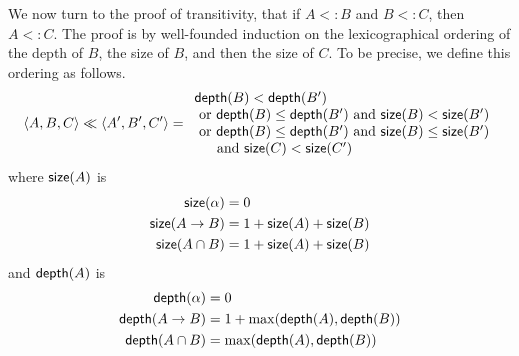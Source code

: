 \documentclass{article}
\begin{document}
We now turn to the proof of transitivity, that if $A <: B$ and $B <:
C$, then $A <: C$.
%
The proof is by well-founded induction on the lexicographical ordering
of the depth of $B$, the size of $B$, and then the size of $C$.  To be
precise, we define this ordering as follows.
\[
\langle A, B, C \rangle \ll \langle A', B', C' \rangle
=
\begin{array}{l}
\mathsf{depth}(B) < \mathsf{depth}(B') \\
\text{ or } \mathsf{depth}(B) \leq \mathsf{depth}(B') \text{ and } \mathsf{size}(B) < \mathsf{size}(B') \\
\text{ or }
  \mathsf{depth}(B) \leq \mathsf{depth}(B') \text{ and } \mathsf{size}(B) \leq \mathsf{size}(B')\\
  \;\quad \text{ and } \mathsf{size}(C) < \mathsf{size}(C')
\end{array}
\]
%
where $\mathsf{size}(A)$ is 
\begin{align*}
  \mathsf{size}(\alpha) &= 0 \\
  \mathsf{size}(A \to B) &= 1 + \mathsf{size}(A) + \mathsf{size}(B) \\
  \mathsf{size}(A \cap B) &= 1 + \mathsf{size}(A) + \mathsf{size}(B)
\end{align*}
and $\mathsf{depth}(A)$ is 
\begin{align*}
  \mathsf{depth}(\alpha) &= 0 \\
  \mathsf{depth}(A \to B) &= 1 + \max(\mathsf{depth}(A), \mathsf{depth}(B)) \\
  \mathsf{depth}(A \cap B) &= \max(\mathsf{depth}(A), \mathsf{depth}(B))
\end{align*}
\end{document}
